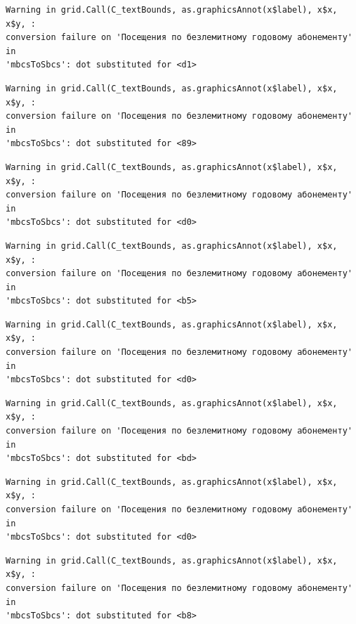 \documentclass[
  letterpaper,
  DIV=11,
  numbers=noendperiod]{scrartcl}
\begin{document}
\begin{verbatim}
Warning in grid.Call(C_textBounds, as.graphicsAnnot(x$label), x$x, x$y, :
conversion failure on 'Посещения по безлемитному годовому абонементу' in
'mbcsToSbcs': dot substituted for <d1>
\end{verbatim}

\begin{verbatim}
Warning in grid.Call(C_textBounds, as.graphicsAnnot(x$label), x$x, x$y, :
conversion failure on 'Посещения по безлемитному годовому абонементу' in
'mbcsToSbcs': dot substituted for <89>
\end{verbatim}

\begin{verbatim}
Warning in grid.Call(C_textBounds, as.graphicsAnnot(x$label), x$x, x$y, :
conversion failure on 'Посещения по безлемитному годовому абонементу' in
'mbcsToSbcs': dot substituted for <d0>
\end{verbatim}

\begin{verbatim}
Warning in grid.Call(C_textBounds, as.graphicsAnnot(x$label), x$x, x$y, :
conversion failure on 'Посещения по безлемитному годовому абонементу' in
'mbcsToSbcs': dot substituted for <b5>
\end{verbatim}

\begin{verbatim}
Warning in grid.Call(C_textBounds, as.graphicsAnnot(x$label), x$x, x$y, :
conversion failure on 'Посещения по безлемитному годовому абонементу' in
'mbcsToSbcs': dot substituted for <d0>
\end{verbatim}

\begin{verbatim}
Warning in grid.Call(C_textBounds, as.graphicsAnnot(x$label), x$x, x$y, :
conversion failure on 'Посещения по безлемитному годовому абонементу' in
'mbcsToSbcs': dot substituted for <bd>
\end{verbatim}

\begin{verbatim}
Warning in grid.Call(C_textBounds, as.graphicsAnnot(x$label), x$x, x$y, :
conversion failure on 'Посещения по безлемитному годовому абонементу' in
'mbcsToSbcs': dot substituted for <d0>
\end{verbatim}

\begin{verbatim}
Warning in grid.Call(C_textBounds, as.graphicsAnnot(x$label), x$x, x$y, :
conversion failure on 'Посещения по безлемитному годовому абонементу' in
'mbcsToSbcs': dot substituted for <b8>
\end{verbatim}
\end{document}

